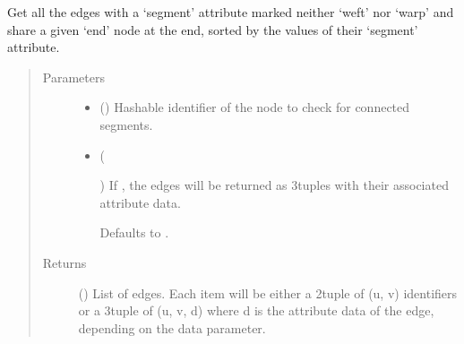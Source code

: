 \documentclass[letterpaper,10pt,english]{sphinxmanual}
\begin{document}
\begin{fulllineitems}
\begin{fulllineitems}
\label{\detokenize{cockatoo:cockatoo.KnitNetworkBase.end_node_segments_by_end}}
Get all the edges with a ‘segment’ attribute marked neither ‘weft’ nor
‘warp’ and share a given ‘end’ node at the end, sorted by the values
of their ‘segment’ attribute.
\begin{quote}\begin{description}
\item[{Parameters}] \leavevmode\begin{itemize}
\item {} 
 () \textendash{} Hashable identifier of the node to check for connected segments.

\item {} 
 (%
\begin{footnote}[84]\sphinxAtStartFootnote
{}
%
\end{footnote}\sphinxstyleliteralemphasis{\sphinxupquote{, }}) \textendash{} 
If , the edges will be returned as 3\sphinxhyphen{}tuples with their
associated attribute data.

Defaults to .


\end{itemize}

\item[{Returns}] \leavevmode
{} () \textendash{} List of edges. Each item will be either a 2\sphinxhyphen{}tuple of (u, v)
identifiers or a 3\sphinxhyphen{}tuple of (u, v, d) where d is the attribute data
of the edge, depending on the data parameter.

\end{description}\end{quote}

\end{fulllineitems}



\end{fulllineitems}
\end{document}
